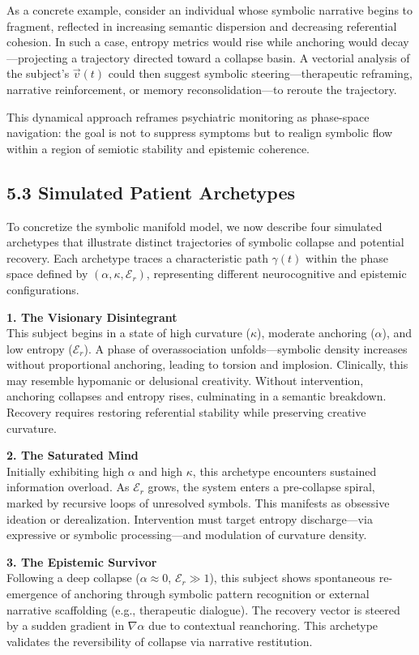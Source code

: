 As a concrete example, consider an individual whose symbolic narrative begins to fragment, reflected in increasing semantic dispersion and decreasing referential cohesion. In such a case, entropy metrics would rise while anchoring would decay—projecting a trajectory directed toward a collapse basin. A vectorial analysis of the subject’s $\vec{v}(t)$ could then suggest symbolic steering—therapeutic reframing, narrative reinforcement, or memory reconsolidation—to reroute the trajectory.

This dynamical approach reframes psychiatric monitoring as phase-space navigation: the goal is not to suppress symptoms but to realign symbolic flow within a region of semiotic stability and epistemic coherence.
\subsection*{5.3 Simulated Patient Archetypes}

To concretize the symbolic manifold model, we now describe four simulated archetypes that illustrate distinct trajectories of symbolic collapse and potential recovery. Each archetype traces a characteristic path $\gamma(t)$ within the phase space defined by $(\alpha, \kappa, \mathcal{E}_r)$, representing different neurocognitive and epistemic configurations.

\textbf{1. The Visionary Disintegrant} \\
This subject begins in a state of high curvature ($\kappa$), moderate anchoring ($\alpha$), and low entropy ($\mathcal{E}_r$). A phase of overassociation unfolds—symbolic density increases without proportional anchoring, leading to torsion and implosion. Clinically, this may resemble hypomanic or delusional creativity. Without intervention, anchoring collapses and entropy rises, culminating in a semantic breakdown. Recovery requires restoring referential stability while preserving creative curvature.

\textbf{2. The Saturated Mind} \\
Initially exhibiting high $\alpha$ and high $\kappa$, this archetype encounters sustained information overload. As $\mathcal{E}_r$ grows, the system enters a pre-collapse spiral, marked by recursive loops of unresolved symbols. This manifests as obsessive ideation or derealization. Intervention must target entropy discharge—via expressive or symbolic processing—and modulation of curvature density.

\textbf{3. The Epistemic Survivor} \\
Following a deep collapse ($\alpha \approx 0$, $\mathcal{E}_r \gg 1$), this subject shows spontaneous re-emergence of anchoring through symbolic pattern recognition or external narrative scaffolding (e.g., therapeutic dialogue). The recovery vector is steered by a sudden gradient in $\nabla \alpha$ due to contextual reanchoring. This archetype validates the reversibility of collapse via narrative restitution.


